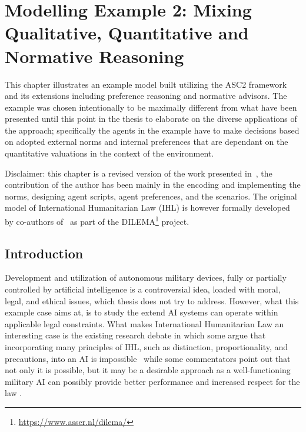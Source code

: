 \chapter{Modelling Example 2: Mixing Qualitative, Quantitative and Normative Reasoning}
\label{ch:jurix}
This chapter illustrates an example model built utilizing the ASC2 framework and its extensions including preference reasoning and normative advisors. The example was chosen intentionally to be maximally different from what have been presented until this point in the thesis to elaborate on the diverse applications of the approach; specifically the agents in the example have to make decisions based on adopted external norms and internal preferences that are dependant on the quantitative valuations in the context of the environment. 

Disclaimer: this chapter is a revised version of the work presented in~\cite{zurek2022can}, the contribution of the author has been mainly in the encoding and implementing the norms, designing agent scripts, agent preferences, and the scenarios. The original model of International Humanitarian Law (IHL) is however formally developed by co-authors of~\cite{zurek2022can} as part of the DILEMA\footnote{\url{https://www.asser.nl/dilema/}} project. 




\section{Introduction}
Development and utilization of autonomous military devices, fully or partially controlled by artificial intelligence is a controversial idea, loaded with moral, legal, and ethical issues, which thesis does not try to address. However, what this example case aims at, is to study the extend AI systems can operate within applicable legal constraints. What makes International Humanitarian Law an interesting case is the existing research debate in which some argue that incorporating many principles of IHL, such as distinction, proportionality, and precautions, into an AI is impossible~\cite{115CrootofRcrdz,120Szpak} while some commentators point out that not only it is possible, but it may be a desirable approach as a well-functioning military AI can possibly provide better performance and increased respect for the law \cite{119DoDaiprinc,119NeyPCIslKeynt}.


